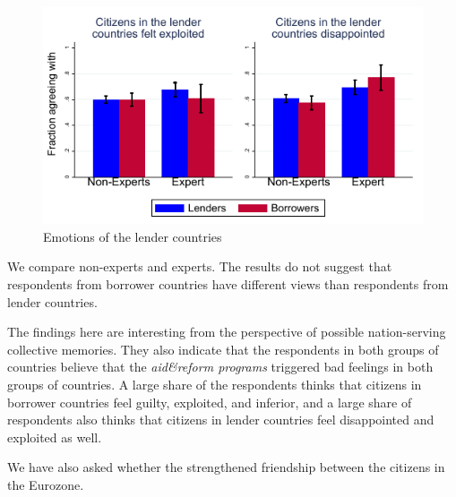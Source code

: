 \begin{figure}[h!]
    \centering
       \caption{Emotions of the lender countries}
    \includegraphics[scale=1.2]{graph5_2.pdf}
 
    \label{fig:my_label}
\end{figure}

We compare non-experts and experts. The results do not suggest that respondents from borrower countries have different views than respondents from lender countries.

The findings here are interesting from the perspective of possible
nation-serving collective memories. They also indicate that the respondents
in both groups of countries believe that the \textit{aid\&reform programs} triggered
bad feelings in both groups of countries. A large share of the respondents
thinks that citizens in borrower countries feel guilty, exploited, and
inferior, and a large share of respondents also thinks that citizens in
lender countries feel disappointed and exploited as well. 

We have also asked whether the  strengthened friendship between the citizens in the Eurozone. 

